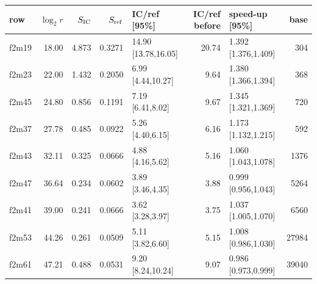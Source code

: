 \begin{tabular}{@{}lrrrlrlr@{}}
\toprule
row & $\log_2 r$ & $S_{\rm IC}$ & $S_{\rm ref}$ & IC/ref [95\%] & IC/ref before & speed-up [95\%] & base \\
\midrule
f2m19 & 18.00 & 4.873 & 0.3271 & 14.90 [13.78,16.05] & 20.74 & 1.392 [1.376,1.409] & 304 \\
f2m23 & 22.00 & 1.432 & 0.2050 & 6.99 [4.44,10.27] & 9.64 & 1.380 [1.366,1.394] & 368 \\
f2m45 & 24.80 & 0.856 & 0.1191 & 7.19 [6.41,8.02] & 9.67 & 1.345 [1.321,1.369] & 720 \\
f2m37 & 27.78 & 0.485 & 0.0922 & 5.26 [4.40,6.15] & 6.16 & 1.173 [1.132,1.215] & 592 \\
f2m43 & 32.11 & 0.325 & 0.0666 & 4.88 [4.16,5.62] & 5.16 & 1.060 [1.043,1.078] & 1376 \\
f2m47 & 36.64 & 0.234 & 0.0602 & 3.89 [3.46,4.35] & 3.88 & 0.999 [0.956,1.043] & 5264 \\
f2m41 & 39.00 & 0.241 & 0.0666 & 3.62 [3.28,3.97] & 3.75 & 1.037 [1.005,1.070] & 6560 \\
f2m53 & 44.26 & 0.261 & 0.0509 & 5.11 [3.82,6.60] & 5.15 & 1.008 [0.986,1.030] & 27984 \\
f2m61 & 47.21 & 0.488 & 0.0531 & 9.20 [8.24,10.24] & 9.07 & 0.986 [0.973,0.999] & 39040 \\
\bottomrule
\end{tabular}
